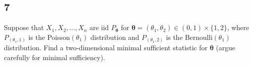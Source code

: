 \documentclass[12pt]{article}
\begin{document}
\begin{enumerate}[label=(\alph*)]
\end{enumerate}



\newpage
\subsection*{7}
\begin{tcolorbox}
  Suppose that $X_1,X_2,\ldots,X_n$ are iid $P_{\bm{\theta}}$ for $\bm{\theta}=(\theta_1,\theta_2)\in(0,1)\times\{1,2\}$, 
  where $P_{(\theta_1,1)}$ is the Poisson$(\theta_1)$ distribution and $P_{(\theta_1,2)}$ is the Bernoulli$(\theta_1)$ distribution.  
  Find a two-dimensional minimal sufficient statistic for $\bm{\theta}$ (argue carefully for minimal sufficiency).
\end{tcolorbox}
\end{document}
